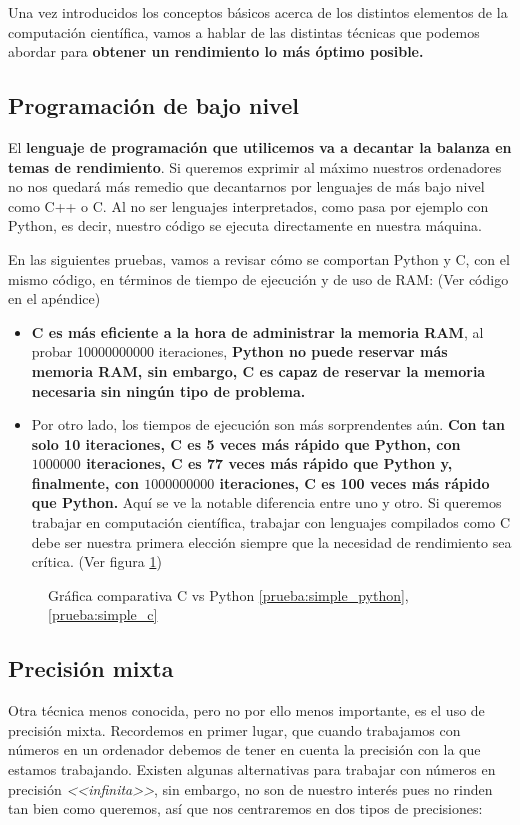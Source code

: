 Una vez introducidos los conceptos básicos acerca de los distintos elementos de la computación científica, vamos a hablar de las distintas técnicas que podemos abordar para \textbf{obtener un rendimiento lo más óptimo posible.}

\subsection{Programación de bajo nivel}
El \textbf{lenguaje de programación que utilicemos va a decantar la balanza en temas de rendimiento}. Si queremos exprimir al máximo nuestros ordenadores no nos quedará más remedio que decantarnos por lenguajes de más bajo nivel como C++ o C. Al no ser lenguajes interpretados, como pasa por ejemplo con Python, es decir, nuestro código se ejecuta directamente en nuestra máquina.

En las siguientes pruebas, vamos a revisar cómo se comportan Python y C, con el mismo código, en términos de tiempo de ejecución y de uso de RAM: (Ver código en el apéndice)

\begin{itemize}
\item \textbf{C es más eficiente a la hora de administrar la memoria RAM}, al probar 10000000000 iteraciones, \textbf{Python no puede reservar más memoria RAM, sin embargo, C es capaz de reservar la memoria necesaria sin ningún tipo de problema.}
  
\item Por otro lado, los tiempos de ejecución son más sorprendentes aún. \textbf{Con tan solo 10 iteraciones, C es 5 veces más rápido que Python, con $1000000$ iteraciones, C es 77 veces más rápido que Python y, finalmente, con $1000000000$ iteraciones, C es 100 veces más rápido que Python.} Aquí se ve la notable diferencia entre uno y otro. Si queremos trabajar en computación científica, trabajar con lenguajes compilados como C debe ser nuestra primera elección siempre que la necesidad de rendimiento sea crítica. (Ver figura \ref{fig:cvspython})
\end{itemize}

\begin{figure}[h]
  \centering
  \caption{Gráfica comparativa C vs Python \ref{prueba:simple_python}, \ref{prueba:simple_c}}
  \label{fig:cvspython}
\end{figure}

\subsection{Precisión mixta}
Otra técnica menos conocida, pero no por ello menos importante, es el uso de precisión mixta. Recordemos en primer lugar, que cuando trabajamos con números en un ordenador debemos de tener en cuenta la precisión con la que estamos trabajando. Existen algunas alternativas para trabajar con números en precisión \textit{<<infinita>>}, sin embargo, no son de nuestro interés pues no rinden tan bien como queremos, así que nos centraremos en dos tipos de precisiones:

